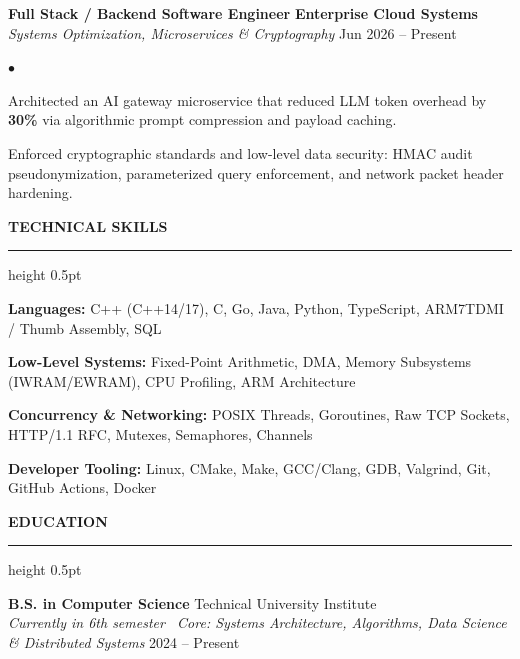 \documentclass[10pt,letterpaper]{article}
\newcommand{\resumesection}[1]{%
  \vspace{2pt}%
  {\color{primary}\normalsize\bfseries\MakeUppercase{#1}}%
  \vspace{1pt}\hrule height 0.5pt\vspace{2pt}%
}
\renewenvironment{itemize}{%
  \begin{list}{\color{primary}$\bullet$}{%
    \setlength{\leftmargin}{1.1em}%
    \setlength{\itemsep}{0.5pt}%
    \setlength{\topsep}{1pt}%
    \setlength{\parsep}{0pt}%
    \setlength{\partopsep}{0pt}%
  }%
}{%
  \end{list}%
}
\newenvironment{skilllist}{%
  \begin{list}{}{%
    \setlength{\leftmargin}{0pt}%
    \setlength{\itemsep}{0.5pt}%
    \setlength{\topsep}{1pt}%
    \setlength{\parsep}{0pt}%
    \setlength{\partopsep}{0pt}%
  }%
}{%
  \end{list}%
}
\begin{document}
\vspace{1.5pt}

\textbf{Full Stack / Backend Software Engineer} \hfill \textbf{Enterprise Cloud Systems} \\
\textit{Systems Optimization, Microservices \& Cryptography} \hfill Jun 2026 -- Present
\begin{itemize}
    \item Architected an AI gateway microservice that reduced LLM token overhead by \textbf{30\%} via algorithmic prompt compression and payload caching.
    \item Enforced cryptographic standards and low-level data security: HMAC audit pseudonymization, parameterized query enforcement, and network packet header hardening.
\end{itemize}

\resumesection{Technical Skills}
\begin{skilllist}
    \item \textbf{Languages:} C++ (C++14/17), C, Go, Java, Python, TypeScript, ARM7TDMI / Thumb Assembly, SQL
    \item \textbf{Low-Level Systems:} Fixed-Point Arithmetic, DMA, Memory Subsystems (IWRAM/EWRAM), CPU Profiling, ARM Architecture
    \item \textbf{Concurrency \& Networking:} POSIX Threads, Goroutines, Raw TCP Sockets, HTTP/1.1 RFC, Mutexes, Semaphores, Channels
    \item \textbf{Developer Tooling:} Linux, CMake, Make, GCC/Clang, GDB, Valgrind, Git, GitHub Actions, Docker
\end{skilllist}

\resumesection{Education}
\textbf{B.S. in Computer Science} \hfill Technical University Institute \\
\textit{Currently in 6th semester \textbar\ Core: Systems Architecture, Algorithms, Data Science \& Distributed Systems} \hfill 2024 -- Present
\end{document}

